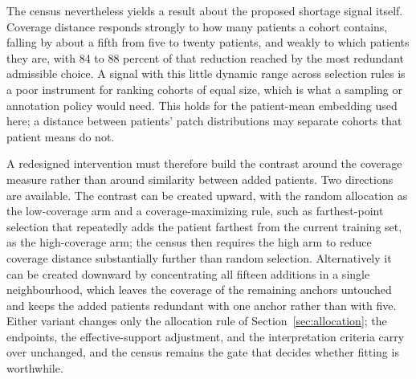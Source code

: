 The census nevertheless yields a result about the proposed shortage signal itself. Coverage distance responds strongly to how many patients a cohort contains, falling by about a fifth from five to twenty patients, and weakly to which patients they are, with 84 to 88 percent of that reduction reached by the most redundant admissible choice. A signal with this little dynamic range across selection rules is a poor instrument for ranking cohorts of equal size, which is what a sampling or annotation policy would need. This holds for the patient-mean embedding used here; a distance between patients' patch distributions may separate cohorts that patient means do not.

A redesigned intervention must therefore build the contrast around the coverage measure rather than around similarity between added patients. Two directions are available. The contrast can be created upward, with the random allocation as the low-coverage arm and a coverage-maximizing rule, such as farthest-point selection that repeatedly adds the patient farthest from the current training set, as the high-coverage arm; the census then requires the high arm to reduce coverage distance substantially further than random selection. Alternatively it can be created downward by concentrating all fifteen additions in a single neighbourhood, which leaves the coverage of the remaining anchors untouched and keeps the added patients redundant with one anchor rather than with five. Either variant changes only the allocation rule of Section~\ref{sec:allocation}; the endpoints, the effective-support adjustment, and the interpretation criteria carry over unchanged, and the census remains the gate that decides whether fitting is worthwhile.
